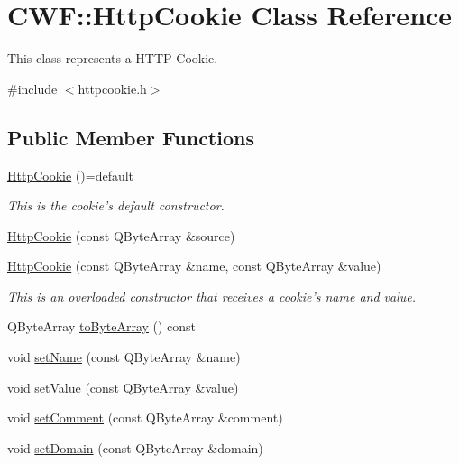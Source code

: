 \hypertarget{class_c_w_f_1_1_http_cookie}{\section{C\+W\+F\+:\+:Http\+Cookie Class Reference}
\label{class_c_w_f_1_1_http_cookie}
}


This class represents a H\+T\+T\+P Cookie.  




{\ttfamily \#include $<$httpcookie.\+h$>$}

\subsection*{Public Member Functions}
\begin{DoxyCompactItemize}
\item 
\hyperlink{class_c_w_f_1_1_http_cookie_a36fafa10bc6c2580acf0b11f007b11ae}{Http\+Cookie} ()=default
\begin{DoxyCompactList}\small\item\em This is the cookie's default constructor. \end{DoxyCompactList}\item 
\hyperlink{class_c_w_f_1_1_http_cookie_a8e43ce5eabd7a7e8dd375232ad3b568e}{Http\+Cookie} (const Q\+Byte\+Array \&source)
\item 
\hyperlink{class_c_w_f_1_1_http_cookie_a2429ad80884ddb6712a9f1fa98e03eac}{Http\+Cookie} (const Q\+Byte\+Array \&name, const Q\+Byte\+Array \&value)
\begin{DoxyCompactList}\small\item\em This is an overloaded constructor that receives a cookie's name and value. \end{DoxyCompactList}\item 
Q\+Byte\+Array \hyperlink{class_c_w_f_1_1_http_cookie_a84c6628ab6c1955fe784bfbe6e66ca7e}{to\+Byte\+Array} () const 
\item 
void \hyperlink{class_c_w_f_1_1_http_cookie_a03cae390cca7717a71ee00d06c8ae8a5}{set\+Name} (const Q\+Byte\+Array \&name)
\item 
void \hyperlink{class_c_w_f_1_1_http_cookie_a0922f5fcdf3873a24ec9a323f10e5a40}{set\+Value} (const Q\+Byte\+Array \&value)
\item 
void \hyperlink{class_c_w_f_1_1_http_cookie_a387cf2fbe8bc9eaeac96f1c5b7ee39a2}{set\+Comment} (const Q\+Byte\+Array \&comment)
\item 
void \hyperlink{class_c_w_f_1_1_http_cookie_a74edb046a8816680bb53a1574b1e1d13}{set\+Domain} (const Q\+Byte\+Array \&domain)

\end{DoxyCompactItemize}
